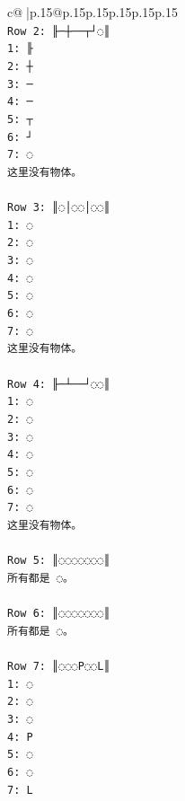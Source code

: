 \documentclass{article}
\begin{document}
{\begin{supertabular}{c@{$\;$}|p{.15\linewidth}@{}p{.15\linewidth}p{.15\linewidth}p{.15\linewidth}p{.15\linewidth}p{.15\linewidth}}
{{{\\ 
\texttt{Row 2: ╟─┼──┬┘◌║} \\
\texttt{1: ╟} \\
\texttt{2: ┼} \\
\texttt{3: ─} \\
\texttt{4: ─} \\
\texttt{5: ┬} \\
\texttt{6: ┘} \\
\texttt{7: ◌} \\
\texttt{这里没有物体。} \\
\\ 
\texttt{Row 3: ║◌│◌◌│◌◌║} \\
\texttt{1: ◌} \\
\texttt{2: ◌} \\
\texttt{3: ◌} \\
\texttt{4: ◌} \\
\texttt{5: ◌} \\
\texttt{6: ◌} \\
\texttt{7: ◌} \\
\texttt{这里没有物体。} \\
\\ 
\texttt{Row 4: ╟─┴──┘◌◌║} \\
\texttt{1: ◌} \\
\texttt{2: ◌} \\
\texttt{3: ◌} \\
\texttt{4: ◌} \\
\texttt{5: ◌} \\
\texttt{6: ◌} \\
\texttt{7: ◌} \\
\texttt{这里没有物体。} \\
\\ 
\texttt{Row 5: ║◌◌◌◌◌◌◌║} \\
\texttt{所有都是 ◌。} \\
\\ 
\texttt{Row 6: ║◌◌◌◌◌◌◌║} \\
\texttt{所有都是 ◌。} \\
\\ 
\texttt{Row 7: ║◌◌◌P◌◌L║} \\
\texttt{1: ◌} \\
\texttt{2: ◌} \\
\texttt{3: ◌} \\
\texttt{4: P} \\
\texttt{5: ◌} \\
\texttt{6: ◌} \\
\texttt{7: L} \\
}}}
\end{supertabular}}
\end{document}
